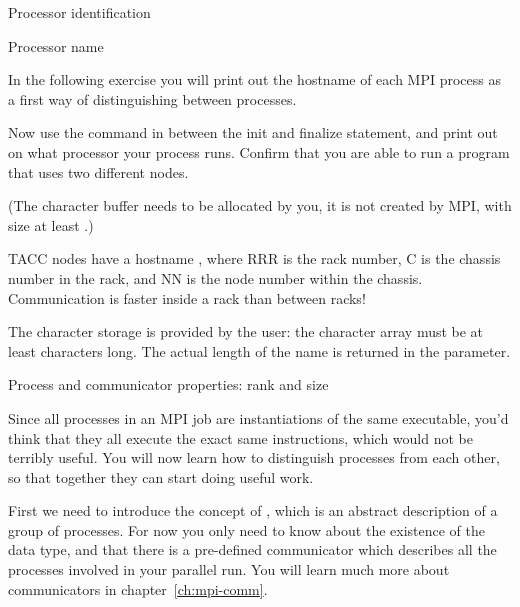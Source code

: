 
 {Processor identification}
\label{sec:rank-size}

 {Processor name}

In the following exercise you will print out the hostname
of each MPI process as a first way of distinguishing between processes.

\begin{exercise}
  \label{ex:procname}
  Now use the command 
  in between the
  init and finalize statement, and print out on what processor your process runs.
  Confirm that you are able to run a program that uses two different nodes.

  (The character buffer needs to be allocated by you, it is not
  created by MPI, with size at
  least .)
\begin{tacc}
TACC nodes have a hostname , where RRR is the rack number, C is the chassis
number in the rack, and NN is the node number within the chassis. Communication
is faster inside a rack than between racks!
\end{tacc}
\end{exercise}

%
The character storage is provided by the user:
the character array must be at least  characters long.
The actual length of the name is returned in the  parameter.

 {Process and communicator properties: rank and size}

Since all processes in an MPI job are instantiations of the same executable,
you'd think that they all execute the exact same instructions,
which would not be terribly useful.
You will now learn how to distinguish
processes from each other, so that together they can start doing
useful work.

First we need to introduce the concept of
, which is an abstract description of a
group of processes. For now you only need to know about the existence
of the  data type, and that there is a
pre-defined communicator  which
describes all the processes involved in your parallel run. You will
learn much more about communicators in chapter~\ref{ch:mpi-comm}.

